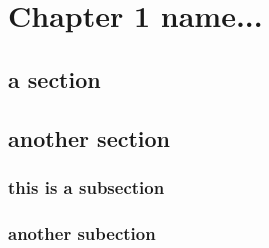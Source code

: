 \chapter{Chapter 1 name...}

\lipsum[2]

\section{a section}

\lipsum[1-2]


\section{another section}

\lipsum[3-5]

\subsection{this is a subsection}

\lipsum[7-8]

\subsection{another subection}

\lipsum[4-6]
